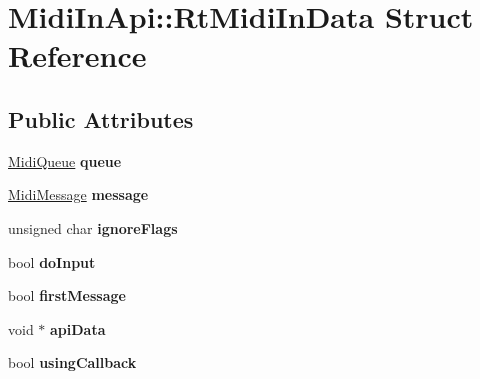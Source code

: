 \hypertarget{struct_midi_in_api_1_1_rt_midi_in_data}{}\section{Midi\+In\+Api\+:\+:Rt\+Midi\+In\+Data Struct Reference}
\label{struct_midi_in_api_1_1_rt_midi_in_data}
\subsection*{Public Attributes}
\begin{DoxyCompactItemize}
\item 
\hyperlink{struct_midi_in_api_1_1_midi_queue}{Midi\+Queue} {\bfseries queue}\hypertarget{struct_midi_in_api_1_1_rt_midi_in_data_ab7aab9c04293fd05680fbc61a045edf5}{}\label{struct_midi_in_api_1_1_rt_midi_in_data_ab7aab9c04293fd05680fbc61a045edf5}

\item 
\hyperlink{struct_midi_in_api_1_1_midi_message}{Midi\+Message} {\bfseries message}\hypertarget{struct_midi_in_api_1_1_rt_midi_in_data_a7d9d8d783b2bca9d12571b132292d29b}{}\label{struct_midi_in_api_1_1_rt_midi_in_data_a7d9d8d783b2bca9d12571b132292d29b}

\item 
unsigned char {\bfseries ignore\+Flags}\hypertarget{struct_midi_in_api_1_1_rt_midi_in_data_a3e520b3ced9881baeb0498f23ba4f30c}{}\label{struct_midi_in_api_1_1_rt_midi_in_data_a3e520b3ced9881baeb0498f23ba4f30c}

\item 
bool {\bfseries do\+Input}\hypertarget{struct_midi_in_api_1_1_rt_midi_in_data_a5f3430b724ade89b95b733dd4d818224}{}\label{struct_midi_in_api_1_1_rt_midi_in_data_a5f3430b724ade89b95b733dd4d818224}

\item 
bool {\bfseries first\+Message}\hypertarget{struct_midi_in_api_1_1_rt_midi_in_data_aa0803a7c74425635cb72cf34ce648341}{}\label{struct_midi_in_api_1_1_rt_midi_in_data_aa0803a7c74425635cb72cf34ce648341}

\item 
void $\ast$ {\bfseries api\+Data}\hypertarget{struct_midi_in_api_1_1_rt_midi_in_data_a2e705ef4c2a8603ddebca08dddb7de8b}{}\label{struct_midi_in_api_1_1_rt_midi_in_data_a2e705ef4c2a8603ddebca08dddb7de8b}

\item 
bool {\bfseries using\+Callback}\hypertarget{struct_midi_in_api_1_1_rt_midi_in_data_ae68e0f1f0791e85fe5f1c026a5eb7568}{}\label{struct_midi_in_api_1_1_rt_midi_in_data_ae68e0f1f0791e85fe5f1c026a5eb7568}


\end{DoxyCompactItemize}
